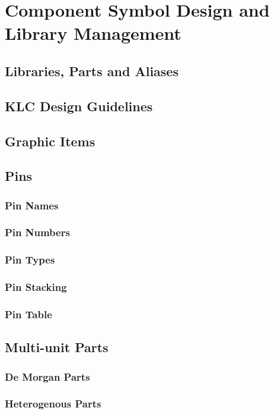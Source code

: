 
\chapter{Component Symbol Design and Library Management}

\section{Libraries, Parts and Aliases}

\section{KLC Design Guidelines}

\section{Graphic Items}

\section{Pins}
\subsection{Pin Names}
\subsection{Pin Numbers}
\subsection{Pin Types}
\subsection{Pin Stacking}
\subsection{Pin Table}

\section{Multi-unit Parts}
\subsection{De Morgan Parts}
\subsection{Heterogenous Parts}
